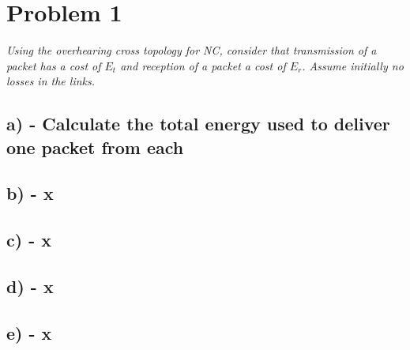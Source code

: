 \section{Problem 1}
\textit{Using the overhearing cross topology for NC, consider that transmission of a packet has a cost of $E_t$ and reception of a packet a cost of $E_r$. Assume initially no losses in the links.}

\subsection{a) - Calculate the total energy used to deliver one packet from each }





\subsection{b) - x }





\subsection{c) - x }






\subsection{d) - x }






\subsection{e) - x }



